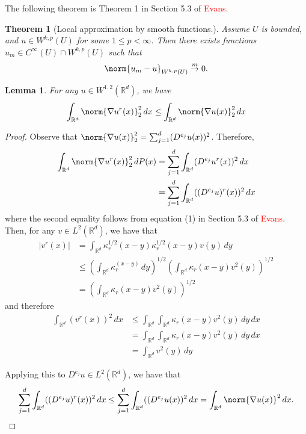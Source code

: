 \documentclass{article}
\newcommand{\Reals}{\mathbb{R}}
\newcommand{\abs}[1]{\left \lvert #1 \right \rvert}
\newcommand{\1}{\mathbf{1}}
\newcommand{\Rd}{\Reals^d}
\theoremstyle{alden}
\theoremstyle{aldenthm}
\newtheorem{theorem}{Theorem}
\newtheorem{lemma}{Lemma}
\theoremstyle{definition}
\theoremstyle{remark}
\begin{document}
The following theorem is Theorem 1 in Section 5.3 of \textcolor{red}{Evans}.
\begin{theorem}[Local approximation by smooth functions.]
	\label{thm:local_approx_smooth_functions}
	Assume $U$ is bounded, and $u \in W^{k,p}(U)$ for some $1 \leq p < \infty$. Then there exists functions $u_m \in C^{\infty}(U) \cap W^{k,p}(U)$ such that
	\begin{equation*}
	\norm{u_m - u}_{W^{k,p}(U)} \overset{m}{\to} 0.
	\end{equation*}
\end{theorem}

\begin{lemma}
	\label{lem:gradient_mollify_commute}
	For any $u \in W^{1,2}(\Rd)$, we have
	\begin{equation*}
	\int_{\Reals^d} \norm{\nabla u^r(x)}_2^2 \,dx \leq \int_{\Reals^d} \norm{\nabla u(x)}_2^2 \,dx
	\end{equation*}
\end{lemma}
\begin{proof}
	Observe that $\norm{\nabla u(x)}_2^2 = \sum_{j = 1}^{d} (D^{e_j}u(x))^2 $. Therefore,
	\begin{align*}
	\int_{\Rd} \norm{\nabla u^r(x)}_2^2 \,dP(x) & = \sum_{j = 1}^{d} \int_{\Rd} (D^{e_j}u^r(x))^2 \,dx \\
	& = \sum_{j = 1}^{d} \int_{\Rd} ((D^{e_j}u)^r(x))^2 \,dx
	\end{align*}
	where the second equality follows from equation (1) in Section 5.3 of \textcolor{red}{Evans}. Then, for any $v \in L^2(\Rd)$, we have that
	\begin{align*}
	\abs{v^r(x)} & = \int_{\Rd} \kappa_r^{1/2}(x - y) \kappa_r^{1/2}(x - y) v(y) \,dy \\
	& \leq \left(\int_{\Rd} \kappa_r^(x - y) \,dy\right)^{1/2} \left(\int_{\Rd} \kappa_r(x - y) v^2(y) \right)^{1/2} \\
	& = \left(\int_{\Rd} \kappa_r(x - y) v^2(y) \right)^{1/2}
	\end{align*}
	and therefore
	\begin{align*}
	\int_{\Rd} (v^r(x))^2 \,dx & \leq \int_{\Rd} \int_{\Rd } \kappa_r(x - y) v^2(y) \,dy \,dx \\
	& = \int_{\Rd} \int_{\Rd } \kappa_r(x - y) v^2(y) \,dy \,dx \\
	& = \int_{\Rd} v^2(y) \,dy
	\end{align*}
	
	Applying this to $D^{e_j}u \in L^2(\Rd)$, we have that
	\begin{equation*}
	\sum_{j = 1}^{d} \int_{\Rd} ((D^{e_j}u)^r(x))^2 \,dx \leq \sum_{j = 1}^{d} \int_{\Rd} ((D^{e_j}u(x))^2 \,dx = \int_{\Rd} \norm{\nabla u(x)}^2 \,dx.
	\end{equation*}
\end{proof}
\end{document}
